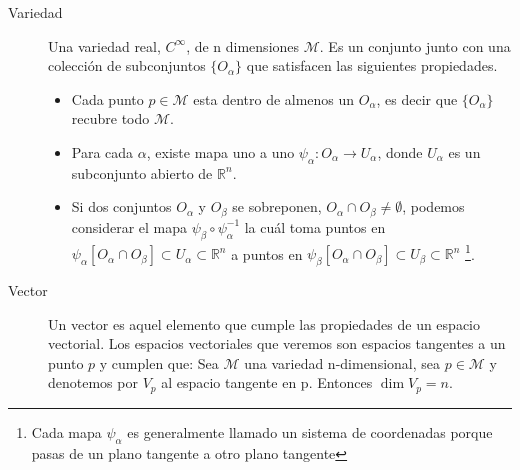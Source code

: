 \documentclass[../Main.tex]{subfiles}
\begin{document}
\begin{description}
    \item [Variedad]
    Una variedad real, $C^{\infty}$, de n dimensiones $\mathcal{M}$. Es un conjunto junto con una colección de subconjuntos $\{O_{\alpha}\}$ que satisfacen las siguientes propiedades.
    \begin{itemize}
        \item Cada punto $p \in \mathcal{M}$ esta dentro de almenos un $O_{\alpha}$, es decir que $\{O_{\alpha}\}$ recubre todo $\mathcal{M}$.
        \item Para cada $\alpha$, existe mapa uno a uno $\psi_{\alpha}:O_{\alpha}\rightarrow U_{\alpha}$, donde $U_{\alpha}$ es un subconjunto abierto de $\mathbb{R}^{n}$.
        \item Si dos conjuntos $O_{\alpha}$ y $O_{\beta}$  se sobreponen, $O_{\alpha} \cap O_{\beta} \neq \emptyset$, podemos considerar el mapa $\psi_{\beta} \circ \psi_{\alpha}^{-1}$ la cuál toma puntos en $\psi_{\alpha}[O_{\alpha} \cap O_{\beta}]\subset U_{\alpha}\subset \mathbb{R}^{n}$ a puntos en $\psi_{\beta}[O_{\alpha} \cap O_{\beta}]\subset U_{\beta}\subset \mathbb{R}^{n}$ \footnote{Cada mapa $\psi_{\alpha}$ es generalmente llamado un sistema de coordenadas porque pasas de un plano tangente a otro plano tangente}.
    \end{itemize}

    \item [Vector]
    Un vector es aquel elemento que cumple las propiedades de un espacio vectorial. Los espacios vectoriales que veremos son espacios tangentes a un punto $p$ y cumplen que: Sea $\mathcal{M}$ una variedad n-dimensional, sea $p \in \mathcal{M}$ y denotemos por $V_{p}$ al espacio tangente en p. Entonces $\dim{V_{p}} = n$.


\end{description}
\end{document}
